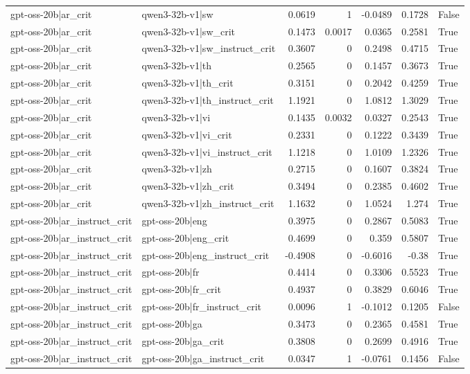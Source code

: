 \begin{table}
\begin{tabular}{l l r r r r l}
gpt-oss-20b|ar_crit & qwen3-32b-v1|sw & 0.0619 & 1 & -0.0489 & 0.1728 & False \\
gpt-oss-20b|ar_crit & qwen3-32b-v1|sw_crit & 0.1473 & 0.0017 & 0.0365 & 0.2581 & True \\
gpt-oss-20b|ar_crit & qwen3-32b-v1|sw_instruct_crit & 0.3607 & 0 & 0.2498 & 0.4715 & True \\
gpt-oss-20b|ar_crit & qwen3-32b-v1|th & 0.2565 & 0 & 0.1457 & 0.3673 & True \\
gpt-oss-20b|ar_crit & qwen3-32b-v1|th_crit & 0.3151 & 0 & 0.2042 & 0.4259 & True \\
gpt-oss-20b|ar_crit & qwen3-32b-v1|th_instruct_crit & 1.1921 & 0 & 1.0812 & 1.3029 & True \\
gpt-oss-20b|ar_crit & qwen3-32b-v1|vi & 0.1435 & 0.0032 & 0.0327 & 0.2543 & True \\
gpt-oss-20b|ar_crit & qwen3-32b-v1|vi_crit & 0.2331 & 0 & 0.1222 & 0.3439 & True \\
gpt-oss-20b|ar_crit & qwen3-32b-v1|vi_instruct_crit & 1.1218 & 0 & 1.0109 & 1.2326 & True \\
gpt-oss-20b|ar_crit & qwen3-32b-v1|zh & 0.2715 & 0 & 0.1607 & 0.3824 & True \\
gpt-oss-20b|ar_crit & qwen3-32b-v1|zh_crit & 0.3494 & 0 & 0.2385 & 0.4602 & True \\
gpt-oss-20b|ar_crit & qwen3-32b-v1|zh_instruct_crit & 1.1632 & 0 & 1.0524 & 1.274 & True \\
gpt-oss-20b|ar_instruct_crit & gpt-oss-20b|eng & 0.3975 & 0 & 0.2867 & 0.5083 & True \\
gpt-oss-20b|ar_instruct_crit & gpt-oss-20b|eng_crit & 0.4699 & 0 & 0.359 & 0.5807 & True \\
gpt-oss-20b|ar_instruct_crit & gpt-oss-20b|eng_instruct_crit & -0.4908 & 0 & -0.6016 & -0.38 & True \\
gpt-oss-20b|ar_instruct_crit & gpt-oss-20b|fr & 0.4414 & 0 & 0.3306 & 0.5523 & True \\
gpt-oss-20b|ar_instruct_crit & gpt-oss-20b|fr_crit & 0.4937 & 0 & 0.3829 & 0.6046 & True \\
gpt-oss-20b|ar_instruct_crit & gpt-oss-20b|fr_instruct_crit & 0.0096 & 1 & -0.1012 & 0.1205 & False \\
gpt-oss-20b|ar_instruct_crit & gpt-oss-20b|ga & 0.3473 & 0 & 0.2365 & 0.4581 & True \\
gpt-oss-20b|ar_instruct_crit & gpt-oss-20b|ga_crit & 0.3808 & 0 & 0.2699 & 0.4916 & True \\
gpt-oss-20b|ar_instruct_crit & gpt-oss-20b|ga_instruct_crit & 0.0347 & 1 & -0.0761 & 0.1456 & False \\

\end{tabular}
\end{table}
